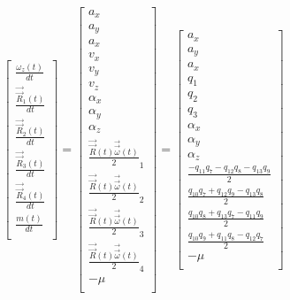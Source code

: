\documentclass{article}
\begin{document}
\begin{equation}
\begin{bmatrix}
    \frac{\omega_z(t)}{dt} \\
    \frac{\vec{\vec{R}}_1(t)}{dt} \\
    \frac{\vec{\vec{R}}_2(t)}{dt} \\
    \frac{\vec{\vec{R}}_3(t)}{dt} \\
    \frac{\vec{\vec{R}}_4(t)}{dt} \\
    \frac{m(t)}{dt} \\
\end{bmatrix}
=
\begin{bmatrix}
    a_x \\
    a_y \\
    a_x \\
    v_x \\
    v_y \\
    v_z \\
    \alpha_x \\
    \alpha_y \\
    \alpha_z \\
    \frac{\vec{\vec{R}}(t)\vec{\vec{\omega}}(t)}{2}_1 \\
    \frac{\vec{\vec{R}}(t)\vec{\vec{\omega}}(t)}{2}_2 \\
    \frac{\vec{\vec{R}}(t)\vec{\vec{\omega}}(t)}{2}_3 \\
    \frac{\vec{\vec{R}}(t)\vec{\vec{\omega}}(t)}{2}_4 \\
    -\mu \\
\end{bmatrix}
=
\begin{bmatrix}
    a_x \\
    a_y \\
    a_x \\
    q_1 \\
    q_2 \\
    q_3 \\
    \alpha_x \\
    \alpha_y \\
    \alpha_z \\
    \frac{-q_{11}q_7 - q_{12}q_8 - q_{13}q_9}{2} \\
    \frac{q_{10}q_7 + q_{12}q_9 - q_{13}q_8}{2} \\
    \frac{q_{10}q_8 + q_{13}q_7 - q_{11}q_9}{2} \\
    \frac{q_{10}q_9 + q_{11}q_8 - q_{12}q_7}{2} \\
    -\mu \\
\end{bmatrix}
\end{equation}
\end{document}
